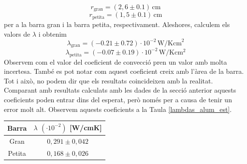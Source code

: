 \documentclass[12pt,twosides,onecolumn,openany]{article}
\newenvironment{Figura}
  {\par\medskip\noindent\minipage{\linewidth}}
  {\endminipage\par\medskip}
\begin{document}
\begin{multicols}{2}
\begin{equation*}
  r_{\text{gran}} = (2,6\pm0.1)\, \text{cm}
\end{equation*}
\begin{equation*}
  r_{\text{petita}} = (1,5\pm0.1)\, \text{cm}
\end{equation*}
per a la barra gran i la barra petita, respectivament. Aleshores, calculem els valors de $\lambda$ i obtenim
\begin{equation*}
  \lambda_{\text{gran}} = (-0.21\pm0.72)\cdot 10^{-2} \, \text{W}/\text{Kcm}^{2}
\end{equation*}
\begin{equation*}
  \lambda_{\text{petita}} = (-0.07\pm0.19)\cdot 10^{-2} \, \text{W}/\text{K}\text{cm}^{2}
\end{equation*}
Observem com el valor del coeficient de convecció pren un valor amb molta incertesa. També es pot notar com aquest coeficient creix amb l'àrea de la barra. Tot i això, no podem dir que els resultats coincideixen amb la realitat. Comparant amb resultats calculats amb les dades de la secció anterior aquests coeficients poden entrar dins del esperat, però només per a causa de tenir un error molt alt. Observem aquests coeficients a la Taula \ref{lambdas_alum_est}.
\begin{Figura}
  \centering
  \begin{tabular}{c|c}
    Barra & $\lambda$ $(\cdot 10^{-2})$ [W/cmK]\\ \hline \hline
    Gran & $0,291\pm0,042$\\
    Petita & $0,168\pm0,026$ 
  \end{tabular}
\end{Figura}

\end{multicols}
\end{document}
